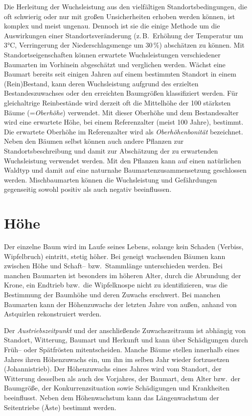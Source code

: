 \documentclass[twocolumn]{scrartcl}
\begin{document}
Die Herleitung der Wuchsleistung aus den vielfältigen Standortsbedingungen, die
oft schwierig oder nur mit großen Unsicherheiten erhoben werden können, ist
komplex und meist ungenau. Dennoch ist sie die einige Methode um die
Auswirkungen einer Standortsveränderung (z.\,B.\ Erhöhung der Temperatur um 3°C,
Verringerung der Niederschlagsmenge um 30\,\%) abschätzen zu können. Mit
Standortseigenschaften können erwartete Wuchsleistungen verschiedener Baumarten
im Vorhinein abgeschätzt und verglichen werden. Wächst eine Baumart bereits seit
einigen Jahren auf einem bestimmten Standort in einem (Rein)Bestand, kann deren
Wuchsleistung aufgrund des erzielten Bestandeszuwachses oder den erreichten
Baumgrößen klassifiziert werden. Für gleichaltrige Reinbestände wird derzeit oft
die Mittelhöhe der 100 stärksten Bäume (=\emph{Oberhöhe})
verwendet. Mit dieser Oberhöhe und dem Bestandesalter wird eine erwartete Höhe,
bei einem Referenzalter (meist 100 Jahre), bestimmt. Die erwartete Oberhöhe im
Referenzalter wird als \emph{Oberhöhenbonität}
bezeichnet. Neben den Bäumen selbst können auch andere Pflanzen zur
Standortsbeschreibung und damit zur Abschätzung der zu erwartenden Wuchsleistung
verwendet werden. Mit den Pflanzen kann auf einen natürlichen Waldtyp und damit
auf eine naturnahe Baumartenzusammensetzung geschlossen werden. Mischbaumarten
können die Wuchsleistung und Gefährdungen gegenseitig sowohl positiv als auch
negativ beeinflussen.

\section{Höhe}

Der einzelne Baum wird im Laufe seines Lebens, solange kein Schaden (Verbiss,
Wipfelbruch) eintritt, stetig höher. Bei geneigt wachsenden Bäumen kann zwischen
Höhe und Schaft-- bzw.\ Stammlänge unterschieden werden. Bei manchen Baumarten
ist besonders im höheren Alter, durch die Abrundung der Krone, ein Endtrieb
bzw.\ die Wipfelknospe nicht zu identifizieren, was die Bestimmung der Baumhöhe
und deren Zuwachs erschwert. Bei manchen Baumarten kann der Höhenzuwachs der
letzten Jahre von außen, anhand von Astquirlen rekonstruiert werden.

Der \emph{Austriebszeitpunkt} und der anschließende Zuwachszeitraum ist abhängig
von Standort, Witterung, Baumart und Herkunft und kann über Schädigungen durch
Früh-- oder Spätfrösten mitentscheiden. Manche Bäume stellen innerhalb eines
Jahres ihren Höhenzuwachs ein, um ihn im selben Jahr wieder fortzusetzen
(Johannistrieb). Der Höhenzuwachs eines Jahres wird vom Standort, der Witterung
desselben als auch des Vorjahres, der Baumart, dem Alter bzw.\ der Baumgröße,
der Konkurrenzsituation sowie Schädigungen und Krankheiten beeinflusst. Neben
dem Höhenwachstum kann das Längenwachstum der Seitentriebe (Äste) bestimmt
werden.
\end{document}
